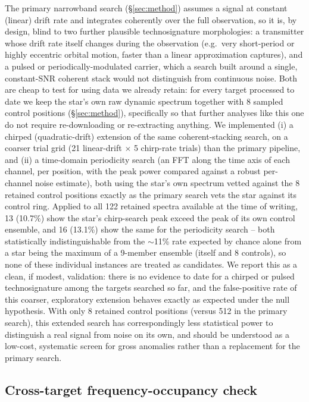 \documentclass{openjournal}
\begin{document}
The primary narrowband search (\S\ref{sec:method}) assumes a signal at
constant (linear) drift rate and integrates coherently over the full
observation, so it is, by design, blind to two further plausible
technosignature morphologies: a transmitter whose drift rate itself
changes during the observation (e.g.\ very short-period or highly
eccentric orbital motion, faster than a linear approximation captures),
and a pulsed or periodically-modulated carrier, which a search built
around a single, constant-SNR coherent stack would not distinguish from
continuous noise. Both are cheap to test for using data we already
retain: for every target processed to date we keep the star's own raw
dynamic spectrum together with 8 sampled control positions
(\S\ref{sec:method}), specifically so that further analyses like this
one do not require re-downloading or re-extracting anything. We
implemented (i) a chirped (quadratic-drift) extension of the same
coherent-stacking search, on a coarser trial grid (21 linear-drift $\times$
5 chirp-rate trials) than the primary pipeline, and (ii) a time-domain
periodicity search (an FFT along the time axis of each channel, per
position, with the peak power compared against a robust per-channel
noise estimate), both using the star's own spectrum vetted against the 8
retained control positions exactly as the primary search vets the star
against its control ring. Applied to all 122 retained spectra available
at the time of writing, 13 (10.7\%) show the star's chirp-search peak
exceed the peak of its own control ensemble, and 16 (13.1\%) show the same
for the periodicity search -- both statistically indistinguishable from
the $\sim$11\% rate expected by chance alone from a star being the
maximum of a 9-member ensemble (itself and 8 controls), so none of these
individual instances are treated as candidates. We report this as a
clean, if modest, validation: there is no evidence to date for a
chirped or pulsed technosignature among the targets searched so far,
and the false-positive rate of this coarser, exploratory extension
behaves exactly as expected under the null hypothesis. With only 8
retained control positions (versus 512 in the primary search), this
extended search has correspondingly less statistical power to
distinguish a real signal from noise on its own, and should be
understood as a low-cost, systematic screen for gross anomalies rather
than a replacement for the primary search.

\subsection{Cross-target frequency-occupancy check}
\label{sec:freqoccupancy}
\end{document}
